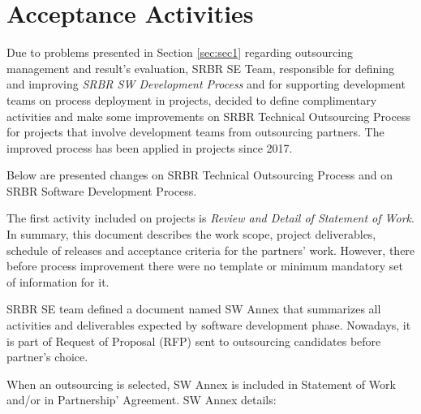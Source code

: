 \section{Acceptance Activities\label{sec:sec3}}

Due to problems presented in Section \ref{sec:sec1} regarding outsourcing management and result's evaluation, SRBR SE Team, responsible for defining and improving \textit{SRBR SW Development Process} and for supporting development teams on process deployment in projects, decided to define complimentary activities and make some improvements on SRBR Technical Outsourcing Process for projects that involve development teams from outsourcing partners. The improved process has been applied in projects since 2017.

Below are presented changes on SRBR Technical Outsourcing Process and on SRBR Software Development Process.

The first activity included on projects is \textit{Review and Detail of Statement of Work}. In summary, this document describes the work scope, project deliverables, schedule of releases and acceptance criteria for the partners' work. However, there before process improvement there were no template or minimum mandatory set of information for it. 

SRBR SE team defined a document named SW Annex that summarizes all activities and deliverables expected by software development phase. Nowadays, it is part of Request of Proposal (RFP) sent to outsourcing candidates before partner's choice. 

When an outsourcing is selected, SW Annex is included in Statement of Work and/or in Partnership' Agreement. SW Annex details:

